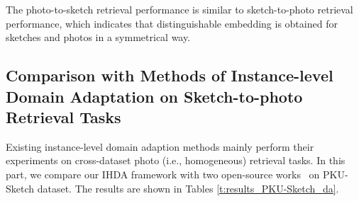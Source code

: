 \documentclass[journal]{IEEEtran}
\begin{document}
\tabcolsep=4pt
\begin{table}[!ht]
\centering
{}
\caption{The performance of photo-to-sketch retrieval on the PKU-Sketch dataset.}
\label{t:results_PKU-Sketch_p2s}
\end{table}

The photo-to-sketch retrieval performance is similar to sketch-to-photo retrieval performance, which indicates that distinguishable embedding is obtained for sketches and photos in a symmetrical way.


\subsection{Comparison with Methods of Instance-level Domain Adaptation on Sketch-to-photo Retrieval Tasks}

Existing instance-level domain adaption methods mainly perform their experiments on cross-dataset photo (i.e., homogeneous) retrieval tasks. In this part, we compare our IHDA framework with two open-source works~\cite{ge2020mutual,song2020unsupervised} on PKU-Sketch dataset. The results are shown in Tables \ref{t:results_PKU-Sketch_da}.

\tabcolsep=4pt
\begin{table}[!ht]
\centering
\caption{The performance of sketch-to-photo retrieval on the PKU-Sketch dataset (compared with DA methods).}
\label{t:results_PKU-Sketch_da}
\end{table}
\end{document}
